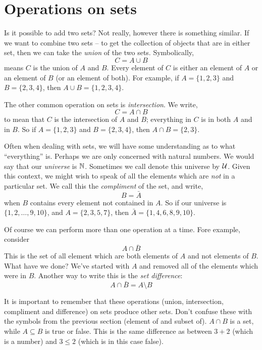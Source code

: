 \documentclass[12pt]{article}
\begin{document}
\section{Operations on sets}

Is it possible to add two sets?  Not really, however there is something similar.  If we want to combine two sets -- to get the collection of objects that are in either set, then we can take the {\em union} of the two sets.  Symbolically,
\[ C = A \cup B\]
means $C$ is the union of $A$ and $B$.  Every element of $C$ is either an element of $A$ or an element of $B$ (or an element of both).  For example, if $A = \{1, 2, 3\}$ and $B = \{2, 3, 4\}$, then $A \cup B = \{1, 2, 3, 4\}$.

The other common operation on sets is {\em intersection}.  We write,
\[ C = A \cap B\]
to mean that $C$ is the intersection of $A$ and $B$; everything in $C$ is in both $A$ and in $B$.  So if $A = \{1, 2, 3\}$ and $B = \{2, 3, 4\}$, then $A \cap B = \{2, 3\}$.  

Often when dealing with sets, we will have some understanding as to what ``everything'' is.  Perhaps we are only concerned with natural numbers.  We would say that our {\em universe} is $\mathbb N$.  Sometimes we call denote this universe by $\mathcal U$.  Given this context, we might wish to speak of all the elements which are {\em not} in a particular set.  We call this the {\em compliment} of the set, and write,
\[ B = \bar A\]
when $B$ contains every element not contained in $A$.  So if our universe is $\{1, 2,\ldots, 9, 10\}$, and $A = \{2, 3, 5, 7\}$, then $\bar A = \{1, 4, 6, 8, 9,10\}$.

Of course we can perform more than one operation at a time.  Fore example, consider
\[A \cap \bar B\]
This is the set of all element which are both elements of $A$ and not elements of $B$.  What have we done?  We've started with $A$ and removed all of the elements which were in $B$.  Another way to write this is the {\em set difference}:
\[A \cap \bar B = A \setminus B\]

It is important to remember that these operations (union, intersection, compliment and difference) on sets produce other sets.  Don't confuse these with the symbols from the previous section (element of and subset of).  $A \cap B$ is a set, while $A \subseteq B$ is true or false.  This is the same difference as between $3 + 2$ (which is a number) and $3 \le 2$ (which is in this case false).
\end{document}
